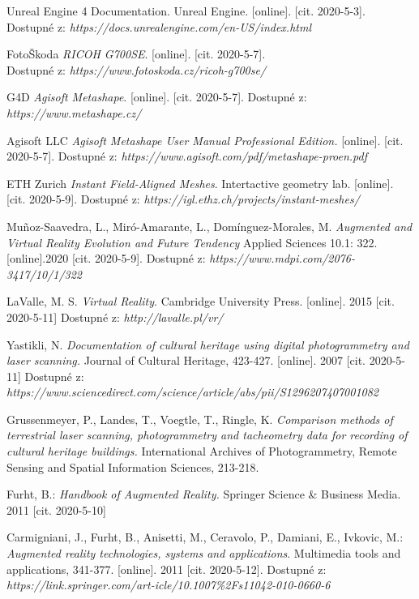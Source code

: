 \documentclass[a4paper, 12pt]{report}
\begin{document}
\begin{thebibliography}{9}
 Unreal Engine 4 Documentation. Unreal Engine. [online]. [cit. 2020-5-3]. Dostupné z: \textit{https://docs.unrealengine.com/en-US/index.html}

 FotoŠkoda \textit{RICOH G700SE}. [online]. [cit. 2020-5-7]. \\Dostupné z: \textit{https://www.fotoskoda.cz/ricoh-g700se/}

 G4D \textit{Agisoft Metashape}. [online]. [cit. 2020-5-7]. Dostupné z: \textit{https://www.metashape.cz/}

 Agisoft LLC \textit{Agisoft Metashape User Manual
Professional Edition.} [online]. [cit. 2020-5-7]. Dostupné z: \textit{https://www.agisoft.com/pdf/metashape-pro\textunderscore en.pdf}

 ETH Zurich \textit{Instant Field-Aligned Meshes}. Intertactive geometry lab. [online]. [cit. 2020-5-9]. Dostupné z: \textit{https://igl.ethz.ch/projects/instant-meshes/}

Muñoz-Saavedra, L., Miró-Amarante, L., Domínguez-Morales, M. \textit{Augmented and Virtual Reality Evolution and Future Tendency} Applied Sciences 10.1: 322. [online].2020 [cit. 2020-5-9]. Dostupné z: \textit{https://www.mdpi.com/2076-3417/10/1/322}

 LaValle, M. S. \textit{Virtual Reality}. Cambridge University Press. [online]. 2015 [cit. 2020-5-11] Dostupné z: \textit{http://lavalle.pl/vr/}

 Yastikli, N. \textit{Documentation of cultural heritage using digital photogrammetry and laser scanning.} Journal of Cultural Heritage, 423-427. [online]. 2007 [cit. 2020-5-11] Dostupné z: \textit{https://www.sciencedirect.com/science/article/abs/pii/S1296207407001082}

 Grussenmeyer, P., Landes, T., Voegtle, T., Ringle, K. \textit{Comparison methods of terrestrial laser scanning, photogrammetry and tacheometry data for recording of cultural heritage buildings.} International Archives of Photogrammetry, Remote Sensing and Spatial Information Sciences, 213-218.

 Furht, B.: \textit{Handbook of Augmented Reality.} Springer Science \& Business Media. 2011 [cit. 2020-5-10]

 Carmigniani, J., Furht, B., Anisetti, M., Ceravolo, P., Damiani, E., Ivkovic, M.: \textit{Augmented reality technologies, systems and applications}. Multimedia tools and applications, 341-377. [online]. 2011 [cit. 2020-5-12]. Dostupné z: \textit{https://link.springer.com/art-icle/10.1007\%2Fs11042-010-0660-6}


\end{thebibliography}
\end{document}
